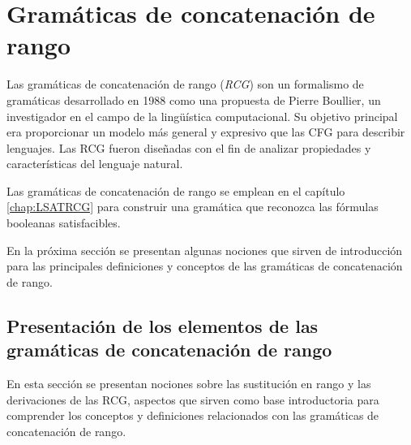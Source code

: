 
\chapter{Gramáticas de concatenación de rango}
\label{chap:RCG}




Las gramáticas de concatenación de rango (\textit{RCG}) \cite{mainRCGBib} son un formalismo de gramáticas desarrollado
en 1988 como una propuesta de Pierre Boullier, un investigador en el campo de la lingüística computacional. Su
objetivo principal era proporcionar un modelo más general y expresivo que las CFG para describir lenguajes.
Las RCG fueron diseñadas con el fin de analizar propiedades y características del lenguaje natural.

Las gramáticas de concatenación de rango se emplean en el capítulo \ref{chap:LSATRCG} para construir una gramática que 
reconozca las fórmulas booleanas satisfacibles. 

En la próxima sección se presentan algunas nociones que sirven de introducción para las principales definiciones y conceptos
de las gramáticas de concatenación de rango.

\section{Presentación de los elementos de las gramáticas de concatenación de rango}

En esta sección se presentan nociones sobre las sustitución en rango y las derivaciones de las RCG, aspectos que sirven como base introductoria para comprender los 
conceptos y definiciones relacionados con las gramáticas de concatenación de rango.

